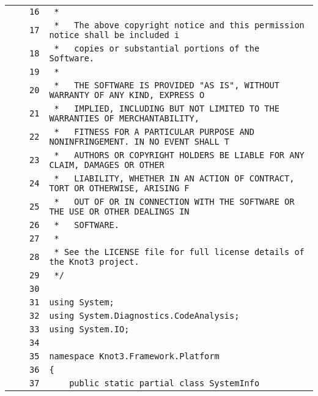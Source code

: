 \documentclass[a4paper,10pt]{article}
\begin{document}
\begin{longtable}[l]{lrrl}
\cellcolor{gray} &  & \verb~16~ & \verb~ *~\\
\cellcolor{gray} &  & \verb~17~ & \verb~ *   The above copyright notice and this permission notice shall be included i~\\
\cellcolor{gray} &  & \verb~18~ & \verb~ *   copies or substantial portions of the Software.~\\
\cellcolor{gray} &  & \verb~19~ & \verb~ *~\\
\cellcolor{gray} &  & \verb~20~ & \verb~ *   THE SOFTWARE IS PROVIDED "AS IS", WITHOUT WARRANTY OF ANY KIND, EXPRESS O~\\
\cellcolor{gray} &  & \verb~21~ & \verb~ *   IMPLIED, INCLUDING BUT NOT LIMITED TO THE WARRANTIES OF MERCHANTABILITY,~\\
\cellcolor{gray} &  & \verb~22~ & \verb~ *   FITNESS FOR A PARTICULAR PURPOSE AND NONINFRINGEMENT. IN NO EVENT SHALL T~\\
\cellcolor{gray} &  & \verb~23~ & \verb~ *   AUTHORS OR COPYRIGHT HOLDERS BE LIABLE FOR ANY CLAIM, DAMAGES OR OTHER~\\
\cellcolor{gray} &  & \verb~24~ & \verb~ *   LIABILITY, WHETHER IN AN ACTION OF CONTRACT, TORT OR OTHERWISE, ARISING F~\\
\cellcolor{gray} &  & \verb~25~ & \verb~ *   OUT OF OR IN CONNECTION WITH THE SOFTWARE OR THE USE OR OTHER DEALINGS IN~\\
\cellcolor{gray} &  & \verb~26~ & \verb~ *   SOFTWARE.~\\
\cellcolor{gray} &  & \verb~27~ & \verb~ *~\\
\cellcolor{gray} &  & \verb~28~ & \verb~ * See the LICENSE file for full license details of the Knot3 project.~\\
\cellcolor{gray} &  & \verb~29~ & \verb~ */~\\
\cellcolor{gray} &  & \verb~30~ & \verb~~\\
\cellcolor{gray} &  & \verb~31~ & \verb~using System;~\\
\cellcolor{gray} &  & \verb~32~ & \verb~using System.Diagnostics.CodeAnalysis;~\\
\cellcolor{gray} &  & \verb~33~ & \verb~using System.IO;~\\
\cellcolor{gray} &  & \verb~34~ & \verb~~\\
\cellcolor{gray} &  & \verb~35~ & \verb~namespace Knot3.Framework.Platform~\\
\cellcolor{gray} &  & \verb~36~ & \verb~{~\\
\cellcolor{gray} &  & \verb~37~ & \verb~    public static partial class SystemInfo~\\

\end{longtable}
\end{document}
